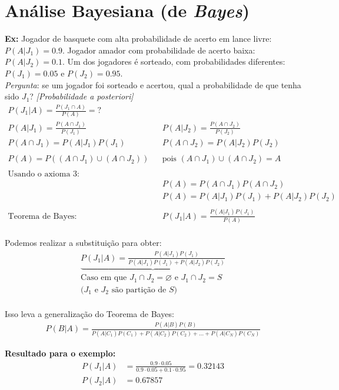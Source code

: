 \documentclass{article}
\renewcommand\bf[1]{\textbf{#1}}
\renewcommand\it[1]{\textit{#1}}
\newcommand{\vn}{\varnothing}
\begin{document}
\section{Análise Bayesiana (de \it{Bayes})}
\bf{Ex:} Jogador de basquete com alta probabilidade de acerto em lance livre: $P(A|J_1) = 0.9$.
Jogador amador com probabilidade de acerto baixa: $P(A|J_2) = 0.1$. Um dos jogadores é sorteado,
com probabilidades diferentes: $P(J_1) = 0.05$ e $P(J_2) = 0.95$.
\\
\it{Pergunta}: se um jogador foi sorteado e acertou, qual a probabilidade de que tenha sido
$J_1$? \it{[Probabilidade a posteriori]}
\begin{align*}
    P(J_1|A) = \frac{P(J_1 \cap A)}{P(A)} =? && \\
    P(A|J_1) = \frac{P(A \cap J_1)}{P(J_1)} && P(A|J_2) = \frac{P(A \cap J_2)}{P(J_2)} \\
    P(A \cap J_1) = P(A|J_1)P(J_1) &&  P(A \cap J_2) = P(A|J_2)P(J_2) \\
    \\
    P(A) =  P((A \cap J_1) \cup (A \cap J_2)) && \text{pois } (A \cap J_1) \cup (A \cap J_2) = A \\
    \\
    \text{Usando o axioma 3:} && \\
        && P(A) = P(A \cap J_1) P(A \cap J_2) \\
        && P(A) = P(A|J_1)P(J_1) + P(A|J_2)P(J_2) \\
    \\
    \text{Teorema de Bayes:}&&{P(J_1|A) = \frac{P(A|J_1)P(J_1)}{P(A)}}\\
\end{align*}

Podemos realizar a substituição para obter:
\begin{align*}
    \underbrace{P(J_1|A) = \frac{P(A|J_1)P(J_1)}{P(A|J_1)P(J_1) + P(A|J_2)P(J_2)}}\\{\text{Caso
    em que $J_1 \cap J_2 = \vn$ e $J_1 \cap J_2 = S$}} \\
    \text{($J_1$ e $J_2$ são partição de $S$)}
\end{align*}
\\[-0.5em]
Isso leva a generalização do Teorema de Bayes:
\begin{align*}
    P(B|A) = \frac{P(A|B)P(B)}{P(A|C_1)P(C_1) +P(A|C_2)P(C_2) + \ldots +P(A|C_N)P(C_N)}
\end{align*}

\bf{Resultado para o exemplo:}
\begin{align*}
    P(J_1|A) &= \frac{0.9 \cdot 0.05}{0.9 \cdot 0.05 + 0.1 \cdot 0.95} = 0.32143 \\
    P(J_2|A) &= 0.67857
\end{align*}
\\[-2em]
\end{document}
